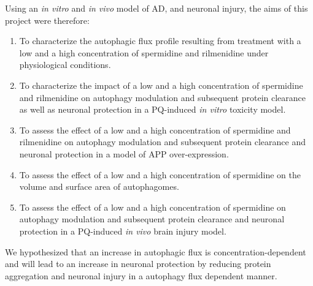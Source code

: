Using an \textit{in vitro} and \textit{in vivo} model of AD, and neuronal injury, the aims of this project were therefore: 
\begin{enumerate}

\item To characterize the autophagic flux profile resulting from treatment with a low and a high concentration of spermidine and rilmenidine under physiological conditions.
\item To characterize the impact of a low and a high concentration of spermidine and rilmenidine on autophagy modulation and subsequent protein clearance as well as neuronal protection in a PQ-induced \textit{in vitro} toxicity model. 
\item To assess the effect of a low and a high concentration of spermidine and rilmenidine on autophagy modulation and subsequent protein clearance and neuronal protection in a model of APP over-expression. 
\item To assess the effect of a low and a high concentration of spermidine on the volume and surface area of autophagomes.
\item To assess the effect of a low and a high concentration of spermidine on autophagy modulation and subsequent protein clearance and neuronal protection in a PQ-induced \textit{in vivo} brain injury model. 

\end{enumerate}

We hypothesized that an increase in autophagic flux is concentration-dependent and will lead to an increase in neuronal protection by reducing protein aggregation and neuronal injury in a autophagy flux dependent manner.



